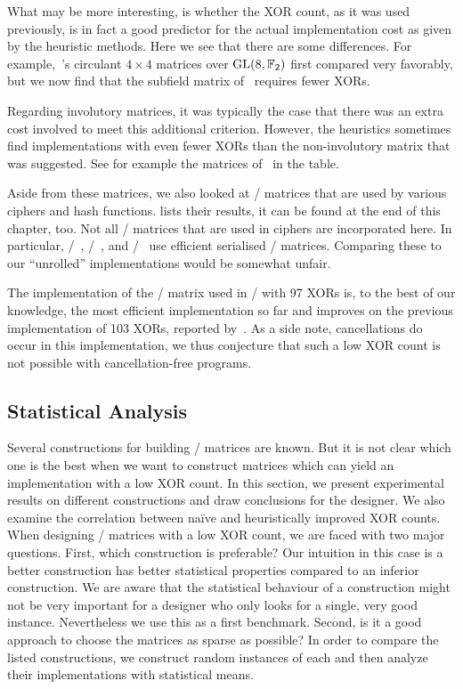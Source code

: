 What may be more interesting, is whether the XOR count, as it was used previously, is in fact a good predictor for the actual implementation cost as given by the heuristic methods.
Here we see that there are some differences.
For example,~\cite{FSE:LiWan16}'s circulant $4 \times 4$ matrices over $\mathrm{GL}(8, \mathbb{F}_2)$ first compared very favorably, but we now find that the subfield matrix of~\cite{ToSC:JPST17} requires fewer XORs.

Regarding involutory matrices, it was typically the case that there was an extra cost involved to meet this additional criterion.
However, the heuristics sometimes find implementations with even fewer XORs than the non-involutory matrix that was suggested.
See for example the matrices of~\cite{ToSC:SarSye16} in the table.

Aside from these matrices, we also looked at \MDS/ matrices that are used by various ciphers and hash functions.
 lists their results, it can be found at the end of this chapter, too.
Not all \MDS/ matrices that are used in ciphers are incorporated here.
In particular, \led/~\cite{CHES:GPPR11}, \photon/~\cite{C:GuoPeyPos11}, and \primates/~\cite{CAESAR:primates} use efficient serialised \MDS/ matrices.
Comparing these to our \enquote{unrolled} implementations would be somewhat unfair.

The implementation of the \MDS/ matrix used in \AES/ with 97 XORs is, to the best of our knowledge, the most efficient implementation so far and improves on the previous implementation of 103 XORs, reported by~.
As a side note, cancellations do occur in this implementation, we thus conjecture that such a low XOR count is not possible with cancellation-free programs.

\subsection{Statistical Analysis}
\label{slps:sec:comparison}
Several constructions for building \MDS/ matrices are known.
But it is not clear which one is the best when we want to construct matrices which can yield an implementation with a low XOR count.
In this section, we present experimental results on different constructions and draw conclusions for the designer.
We also examine the correlation between na\"ive and heuristically improved XOR counts.
When designing \MDS/ matrices with a low XOR count, we are faced with two major questions.
First, which construction is preferable?
Our intuition in this case is a better construction has better statistical properties compared to an inferior construction.
We are aware that the statistical behaviour of a construction might not be very important for a designer who only looks for a single, very good instance.
Nevertheless we use this as a first benchmark.
Second, is it a good approach to choose the matrices as sparse as possible?
In order to compare the listed constructions, we construct random instances of each and then analyze their implementations with statistical means.

